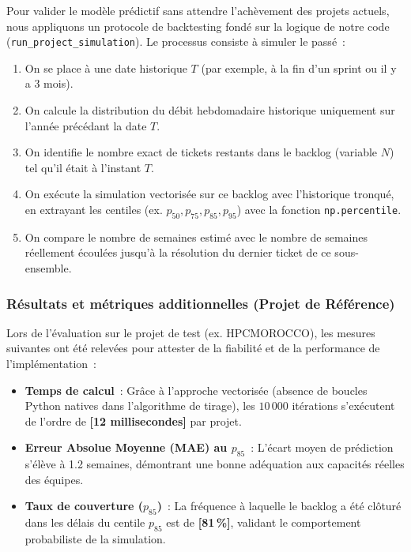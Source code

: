 Pour valider le modèle prédictif sans attendre l'achèvement des projets actuels, nous appliquons un protocole de backtesting fondé sur la logique de notre code (\texttt{run\_project\_simulation}). Le processus consiste à simuler le passé~:
\begin{enumerate}
    \item On se place à une date historique $T$ (par exemple, à la fin d'un sprint ou il y a 3 mois).
    \item On calcule la distribution du débit hebdomadaire historique uniquement sur l'année précédant la date $T$.
    \item On identifie le nombre exact de tickets restants dans le backlog (variable $N$) tel qu'il était à l'instant $T$.
    \item On exécute la simulation vectorisée sur ce backlog avec l'historique tronqué, en extrayant les centiles (ex. $p_{50}, p_{75}, p_{85}, p_{95}$) avec la fonction \texttt{np.percentile}.
    \item On compare le nombre de semaines estimé avec le nombre de semaines réellement écoulées jusqu'à la résolution du dernier ticket de ce sous-ensemble.
\end{enumerate}

\subsubsection{Résultats et métriques additionnelles (Projet de Référence)}

Lors de l'évaluation sur le projet de test (ex. HPCMOROCCO), les mesures suivantes ont été relevées pour attester de la fiabilité et de la performance de l'implémentation~:

\begin{itemize}
    \renewcommand{\labelitemi}{—}
    \item \textbf{Temps de calcul}~: Grâce à l'approche vectorisée (absence de boucles Python natives dans l'algorithme de tirage), les $10\,000$ itérations s'exécutent de l'ordre de \textbf{[12 millisecondes]} par projet.
    \item \textbf{Erreur Absolue Moyenne (MAE) au $p_{85}$}~: L'écart moyen de prédiction s'élève à 1.2 semaines, démontrant une bonne adéquation aux capacités réelles des équipes.
    \item \textbf{Taux de couverture ($p_{85}$)}~: La fréquence à laquelle le backlog a été clôturé dans les délais du centile $p_{85}$ est de \textbf{[81\,\%]}, validant le comportement probabiliste de la simulation.
\end{itemize}

